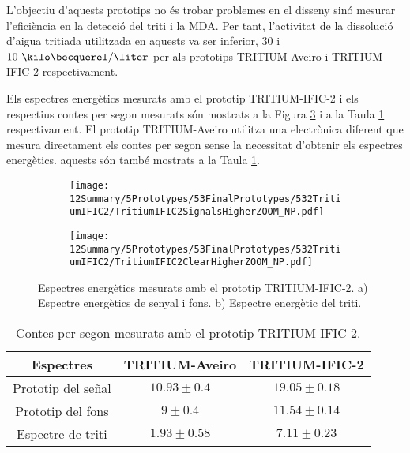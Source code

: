 L'objectiu d'aquests prototips no és trobar problemes en el disseny sinó mesurar l'eficiència en la detecció del triti i la MDA. Per tant, l'activitat de la dissolució d'aigua tritiada utilitzada en aquests va ser inferior, $30$ i $10~\kilo\becquerel/\liter$ per als prototips TRITIUM-Aveiro i TRITIUM-IFIC-2 respectivament.

Els espectres energètics mesurats amb el prototip TRITIUM-IFIC-2 i els respectius contes per segon mesurats són  mostrats a la Figura \ref{fig:EspectresEnergeticsTRITIUMIFIC2} i a la Taula \ref{tab:ContesPerSegonTRITIUMIFIC2} respectivament. El prototip TRITIUM-Aveiro utilitza una electrònica diferent que mesura directament els contes per segon sense la necessitat d'obtenir els espectres energètics. aquests són també mostrats a la Taula \ref{tab:ContesPerSegonTRITIUMIFIC2}.

\begin{figure}
\centering
    \begin{subfigure}[b]{1\textwidth}
    \centering
    \texttt{[image: 12Summary/5Prototypes/53FinalPrototypes/532TritiumIFIC2/TritiumIFIC2SignalsHigherZOOM\_NP.pdf]}  
    \caption{\label{subfig:EspectreEnergeticSenyalFonsTritiumIFIC2}}
    \end{subfigure}
    \hfill
    \begin{subfigure}[b]{1\textwidth}
    \centering
    \texttt{[image: 12Summary/5Prototypes/53FinalPrototypes/532TritiumIFIC2/TritiumIFIC2ClearHigherZOOM\_NP.pdf]}  
    \caption{\label{subfig:EspectreEnergeticTritiTritiumIFIC2}}
    \end{subfigure}
 \caption{Espectres energètics mesurats amb el prototip TRITIUM-IFIC-2. a) Espectre energètics de senyal i fons. b) Espectre energètic del triti.}
 \label{fig:EspectresEnergeticsTRITIUMIFIC2}
\end{figure}

\begin{table}[htbp]
\centering{}%
\begin{tabular}{ccc}
\toprule 
Espectres & TRITIUM-Aveiro & TRITIUM-IFIC-2  \tabularnewline
\midrule
\midrule 
Prototip del señal & $10.93 \pm 0.4$ & $19.05 \pm 0.18$ \tabularnewline
Prototip del fons & $9 \pm 0.4$ & $11.54 \pm 0.14$ \tabularnewline  
Espectre de triti & $1.93 \pm 0.58$ & $7.11 \pm 0.23$ \tabularnewline
\bottomrule
\end{tabular}
\caption{Contes per segon mesurats amb el prototip TRITIUM-IFIC-2.}
\label{tab:ContesPerSegonTRITIUMIFIC2}
\end{table}

